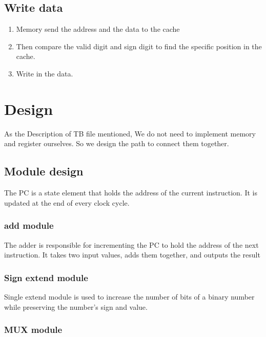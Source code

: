 \documentclass[12pt,a4paper]{article}
\begin{document}
\subsection{Write data}

\begin{enumerate}
\item Memory send the address and the data to the cache
\item Then compare the valid digit and sign digit to find the specific position in the cache.
\item Write in the data.

\end{enumerate}

\newpage

\section{Design}

As the Description of TB file mentioned, We do not need to implement memory and register ourselves.
So we design the path to connect them together.

\subsection{Module design}

The PC is a state element that holds the address of the current instruction. 
It is updated at the end of every clock cycle.

\subsubsection{add module}

The adder is responsible for incrementing the PC to hold the address of the next instruction.
It takes two input values, adds them together, and outputs the result

\subsubsection{Sign extend module}

Single extend module is used to increase the number of bits of a binary number while preserving the number's sign and value. 

\subsubsection{MUX module}
\end{document}
